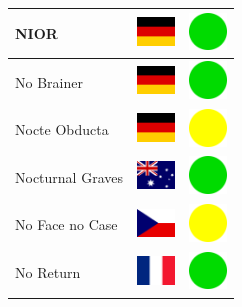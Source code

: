 \documentclass[12pt, a4paper, twoside]{report}
\begin{document}
\begin{center}
\begin{longtable}{|p{5cm}|p{2cm}|p{2cm}|}
NIOR & \includegraphics[width=1cm]{4x3/de} & \includegraphics[width=1cm]{likes/y} \\ \hline
No Brainer & \includegraphics[width=1cm]{4x3/de} & \includegraphics[width=1cm]{likes/y} \\ \hline
Nocte Obducta & \includegraphics[width=1cm]{4x3/de} & \includegraphics[width=1cm]{likes/m} \\ \hline
Nocturnal Graves & \includegraphics[width=1cm]{4x3/au} & \includegraphics[width=1cm]{likes/y} \\ \hline
No Face no Case & \includegraphics[width=1cm]{4x3/cz} & \includegraphics[width=1cm]{likes/m} \\ \hline
No Return & \includegraphics[width=1cm]{4x3/fr} & \includegraphics[width=1cm]{likes/y} \\ \hline

\end{longtable}
\end{center}
\end{document}
